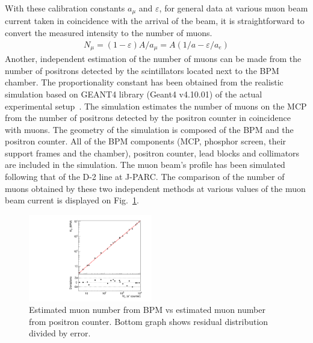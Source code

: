 \documentclass[preprint,3p,twocolumn]{elsarticle}
\begin{document}
With these calibration constants $a_\mu$ and $\varepsilon$, for general data at various muon beam current taken in coincidence with the arrival of the beam, it is straightforward to convert the measured intensity to the number of muons.
{\fontsize{9pt}{0}
	\setlength{\mathindent}{0pt}
	\setlength{\abovedisplayskip}{5pt}
	\setlength{\belowdisplayskip}{5pt}
	\begin{equation}
	\begin{split}
	N_{\mu}=(1-\varepsilon)A/a_\mu=A(1/a-\varepsilon/a_e)
	\end{split}
	\end{equation}
}
\indent
Another, independent estimation of the number of muons can be made from the number of positrons detected by the scintillators located next to the BPM chamber. The proportionality constant has been obtained from the realistic simulation based on GEANT4 library (Geant4 v4.10.01) of the actual experimental setup~\cite{geant4}. 
The simulation estimates the number of muons on the MCP from the number of positrons detected by the positron counter in coincidence with muons. 
The geometry of the simulation is composed of the BPM and the positron counter. 
All of the BPM components (MCP, phosphor screen, their support frames and the chamber), positron counter, lead blocks and collimators are included in the simulation. The muon beam's profile has been simulated following that of the D-2 line at J-PARC. The comparison of the number of muons obtained by these two independent methods at various values of the muon beam current is displayed on Fig.~\ref{fig:muvsmu}. 
\begin{figure}[tb]
	\begin{center}
		\includegraphics[width=0.48\textwidth, height=0.48\textwidth]{figure/lin.pdf}
		\caption{Estimated muon number from BPM vs estimated muon number from positron counter.
			Bottom graph shows residual distribution divided by error.}
	\end{center}
	\vspace{-0.5cm}
	\label{fig:muvsmu}
\end{figure}
\end{document}
